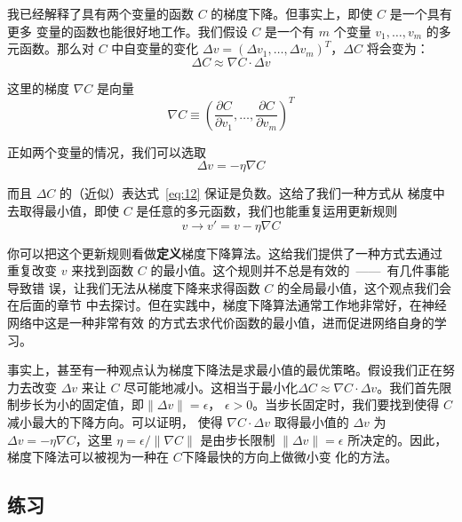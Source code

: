 我已经解释了具有两个变量的函数 $C$ 的梯度下降。但事实上，即使 $C$ 是一个具有更多
变量的函数也能很好地工作。我们假设 $C$ 是一个有 $m$ 个变量 $v_1,\ldots,v_m$ 的多
元函数。那么对 $C$ 中自变量的变化 $\Delta v = (\Delta v_1, \ldots, \Delta
v_m)^T$，$\Delta C$ 将会变为：
\begin{equation}
  \Delta C \approx \nabla C \cdot \Delta v
  \label{eq:12}\tag{12}
\end{equation}

这里的梯度 $\nabla C$ 是向量
\begin{equation}
  \nabla C \equiv \left(\frac{\partial C}{\partial v_1}, \ldots,
    \frac{\partial C}{\partial v_m}\right)^T
  \label{eq:13}\tag{13}
\end{equation}

正如两个变量的情况，我们可以选取
\begin{equation}
  \Delta v = -\eta \nabla C
  \label{eq:14}\tag{14}
\end{equation}

而且 $\Delta C$ 的（近似）表达式~\eqref{eq:12} 保证是负数。这给了我们一种方式从
梯度中去取得最小值，即使 $C$ 是任意的多元函数，我们也能重复运用更新规则
\begin{equation}
  v \rightarrow v' = v-\eta \nabla C
  \label{eq:15}\tag{15}
\end{equation}

你可以把这个更新规则看做\textbf{定义}梯度下降算法。这给我们提供了一种方式去通过
重复改变 $v$ 来找到函数 $C$ 的最小值。这个规则并不总是有效的~——~有几件事能导致错
误，让我们无法从梯度下降来求得函数 $C$ 的全局最小值，这个观点我们会在后面的章节
中去探讨。但在实践中，梯度下降算法通常工作地非常好，在神经网络中这是一种非常有效
的方式去求代价函数的最小值，进而促进网络自身的学习。

事实上，甚至有一种观点认为梯度下降法是求最小值的最优策略。假设我们正在努力去改变
$\Delta v$ 来让 $C$ 尽可能地减小。这相当于最小化$\Delta C \approx \nabla C \cdot
\Delta v$。我们首先限制步长为小的固定值，即$\| \Delta v \| = \epsilon$，
$\epsilon > 0$。当步长固定时，我们要找到使得 $C$ 减小最大的下降方向。可以证明，
使得 $\nabla C \cdot \Delta v$ 取得最小值的 $\Delta v$ 为 $\Delta v = - \eta
\nabla C$，这里 $\eta = \epsilon / \|\nabla C\|$ 是由步长限制 $\|\Delta v\| =
\epsilon$ 所决定的。因此，梯度下降法可以被视为一种在 $C$下降最快的方向上做微小变
化的方法。

\subsection*{练习}

